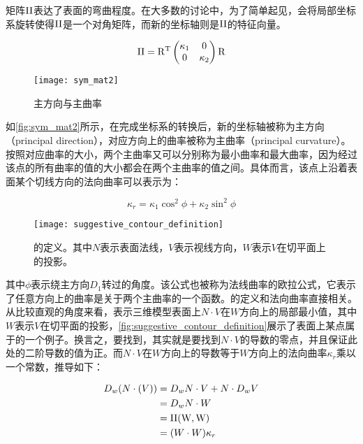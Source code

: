 矩阵$\rm II$表达了表面的弯曲程度。在大多数的讨论中，为了简单起见，会将局部坐标系旋转使得$\rm II$是一个对角矩阵，而新的坐标轴则是$\rm II$的特征向量。

\begin{equation}
    \rm II = R^T
    \begin{pmatrix}
        \kappa_1 & 0 \\
        0 & \kappa_2
    \end{pmatrix}
    R
\end{equation}

\begin{figure}[tbh]
    \centering
    \texttt{[image: sym\_mat2]}
    \caption[主方向与主曲率]{\label{fig:sym_mat2}
    主方向与主曲率\cite{rusinkiewicz2008line}}
\end{figure}

如\autoref{fig:sym_mat2}所示，在完成坐标系的转换后，新的坐标轴被称为主方向（principal direction），对应方向上的曲率被称为主曲率（principal curvature）。按照对应曲率的大小，两个主曲率又可以分别称为最小曲率和最大曲率，因为经过该点的所有曲率的值的大小都会在两个主曲率的值之间。具体而言，该点上沿着表面某个切线方向的法向曲率可以表示为：

\begin{equation}
    \kappa_r = \kappa_1\cos^2\phi + \kappa_2\sin^2\phi
\end{equation}

\begin{figure}[tbp]
    \centering
    \texttt{[image: suggestive\_contour\_definition]}
    \caption[\scon{}的定义]{\label{fig:suggestive_contour_definition}
    \scon{}的定义。其中$N$表示表面法线，$V$表示视线方向，$W$表示$V$在切平面上的投影。}
\end{figure}

其中$\phi$表示绕主方向$D_1$转过的角度。该公式也被称为法线曲率的欧拉公式，它表示了任意方向上的曲率是关于两个主曲率的一个函数。\scon{}的定义和法向曲率直接相关。从比较直观的角度来看，\scon{}表示三维模型表面上$N\cdot{V}$在$W$方向上的局部最小值，其中$W$表示$V$在切平面的投影，\autoref{fig:suggestive_contour_definition}展示了表面上某点属于\scon{}的一个例子。换言之，要找到\scon{}，其实就是要找到$N\cdot{V}$的导数的零点，并且保证此处的二阶导数的值为正。而$N\cdot{V}$在$W$方向上的导数等于$W$方向上的法向曲率$\kappa_r$乘以一个常数，推导如下：

\begin{align}
    D_w(N\cdot(V)) &= D_w{N}\cdot{V} + N\cdot{D_w{V}} \\
                   &= D_w{N}\cdot{W} \\
                   &= \rm II(W, W) \\
                   &= (W\cdot{W})\kappa_r
\end{align}
  
